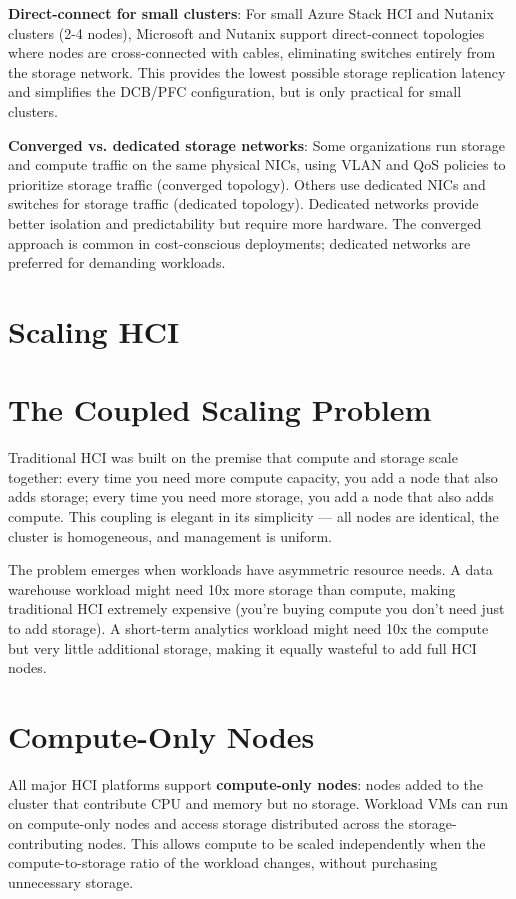 \textbf{Direct-connect for small clusters}: For small Azure Stack HCI and Nutanix clusters (2-4 nodes), Microsoft and Nutanix support direct-connect topologies where nodes are cross-connected with cables, eliminating switches entirely from the storage network. This provides the lowest possible storage replication latency and simplifies the DCB/PFC configuration, but is only practical for small clusters.

\textbf{Converged vs. dedicated storage networks}: Some organizations run storage and compute traffic on the same physical NICs, using VLAN and QoS policies to prioritize storage traffic (converged topology). Others use dedicated NICs and switches for storage traffic (dedicated topology). Dedicated networks provide better isolation and predictability but require more hardware. The converged approach is common in cost-conscious deployments; dedicated networks are preferred for demanding workloads.

\section{Scaling HCI}
\section{The Coupled Scaling Problem}
Traditional HCI was built on the premise that compute and storage scale together: every time you need more compute capacity, you add a node that also adds storage; every time you need more storage, you add a node that also adds compute. This coupling is elegant in its simplicity --- all nodes are identical, the cluster is homogeneous, and management is uniform.

The problem emerges when workloads have asymmetric resource needs. A data warehouse workload might need 10x more storage than compute, making traditional HCI extremely expensive (you're buying compute you don't need just to add storage). A short-term analytics workload might need 10x the compute but very little additional storage, making it equally wasteful to add full HCI nodes.

\section{Compute-Only Nodes}
All major HCI platforms support \textbf{compute-only nodes}: nodes added to the cluster that contribute CPU and memory but no storage. Workload VMs can run on compute-only nodes and access storage distributed across the storage-contributing nodes. This allows compute to be scaled independently when the compute-to-storage ratio of the workload changes, without purchasing unnecessary storage.

